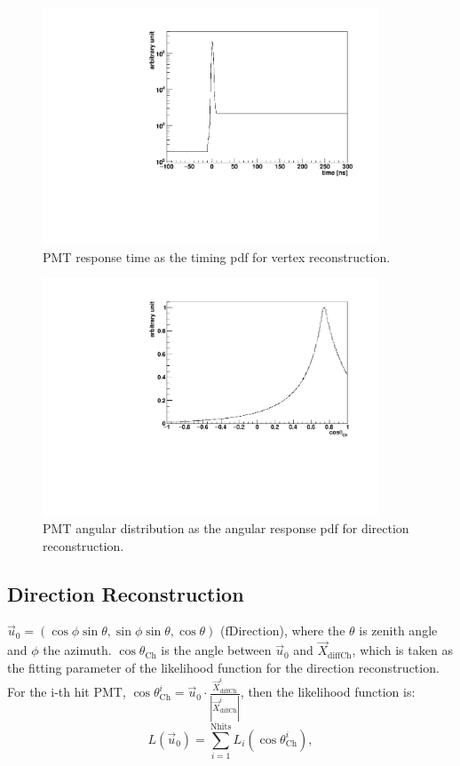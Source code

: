 \begin{figure}[!htb]
	\centering
	\includegraphics[width=10cm]{MPW_timingPDF.pdf}
	\caption{PMT response time as the timing pdf for vertex reconstruction.}
	\label{MPW_timingPDF}
\end{figure}



\begin{figure}[!htb]
	\centering
	\includegraphics[width=10cm]{MPW_angularPDF.pdf}
	\caption{PMT angular distribution as the angular response pdf for direction reconstruction.}
	\label{MPW_angularPDF}
\end{figure}

\subsection{Direction Reconstruction}
 $\vec{u}_{0}=(\cos\phi\sin\theta,\sin\phi\sin\theta,\cos\theta)$ ($\mathrm{fDirection}$), where the $\theta$ is zenith angle and $\phi$ the azimuth. $\cos\theta_{\mathrm{Ch}}$ is the angle between $\vec{u}_{0}$ and $\vec{X}_{{\mathrm{diffCh}}}$, which is taken as the fitting parameter of the likelihood function for the direction reconstruction. For the i-th hit PMT, $\cos\theta^i_{\mathrm{Ch}}=\vec{u}_0\cdot\frac{\vec{X}^i_{{\mathrm{diffCh}}}}{|\vec{X}^i_{{\mathrm{diffCh}}}|}$, then the likelihood function is:
\[
L(\vec{u}_0)=\sum_{i=1}^{{\mathrm{Nhits}}}L_i(\cos\theta_{\mathrm{Ch}}^i),
\]

